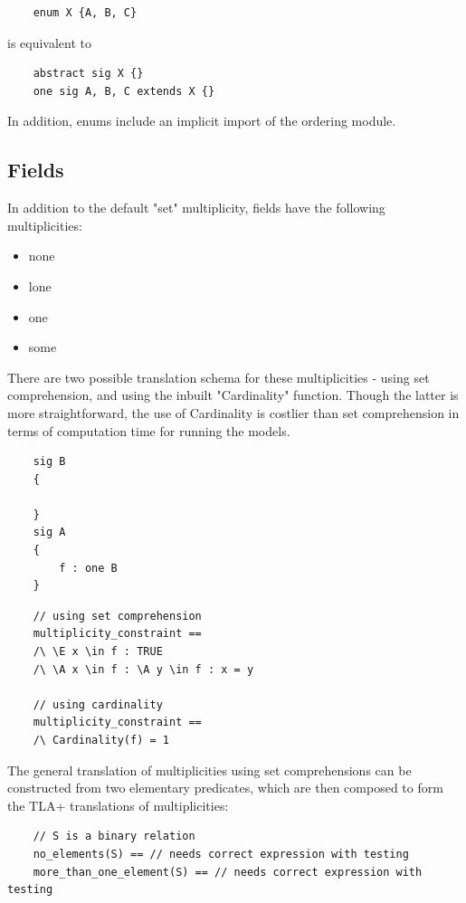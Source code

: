 \begin{verbatim}
	enum X {A, B, C}
\end{verbatim}

is equivalent to

\begin{verbatim}
	abstract sig X {}
	one sig A, B, C extends X {}
\end{verbatim}

In addition, enums include an implicit import of the ordering module.


\subsection{Fields}

In addition to the default "set" multiplicity, fields have the following multiplicities:

\begin{itemize}
	\item none
	\item lone
	\item one
	\item some
\end{itemize}

There are two possible translation schema for these multiplicities - using set comprehension, and using the inbuilt "Cardinality" function. Though the latter is more straightforward, the use of Cardinality is costlier than set comprehension in terms of computation time for running the models.

\begin{verbatim}
	sig B
	{

	}
	sig A
	{
		f : one B
	}
\end{verbatim}

\begin{verbatim}
	// using set comprehension
	multiplicity_constraint == 
	/\ \E x \in f : TRUE
	/\ \A x \in f : \A y \in f : x = y

	// using cardinality
	multiplicity_constraint ==
	/\ Cardinality(f) = 1
\end{verbatim}

The general translation of multiplicities using set comprehensions can be constructed from two elementary predicates, which are then composed to form the TLA+ translations of multiplicities:

\begin{verbatim}
	// S is a binary relation
	no_elements(S) == // needs correct expression with testing
	more_than_one_element(S) == // needs correct expression with testing
\end{verbatim}

